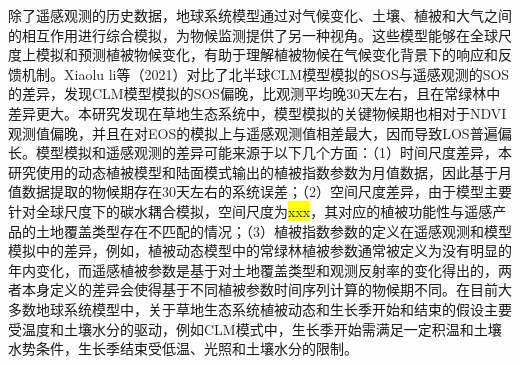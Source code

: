 除了遥感观测的历史数据，地球系统模型通过对气候变化、土壤、植被和大气之间的相互作用进行综合模拟，为物候监测提供了另一种视角。这些模型能够在全球尺度上模拟和预测植被物候变化，有助于理解植被物候在气候变化背景下的响应和反馈机制。Xiaolu li等（2021）对比了北半球CLM模型模拟的SOS与遥感观测的SOS的差异，发现CLM模型模拟的SOS偏晚，比观测平均晚30天左右，且在常绿林中差异更大。本研究发现在草地生态系统中，模型模拟的关键物候期也相对于NDVI观测值偏晚，并且在对EOS的模拟上与遥感观测值相差最大，因而导致LOS普遍偏长。模型模拟和遥感观测的差异可能来源于以下几个方面：（1）时间尺度差异，本研究使用的动态植被模型和陆面模式输出的植被指数参数为月值数据，因此基于月值数据提取的物候期存在30天左右的系统误差；（2）空间尺度差异，由于模型主要针对全球尺度下的碳水耦合模拟，空间尺度为\colorbox{yellow}{xxx}，其对应的植被功能性与遥感产品的土地覆盖类型存在不匹配的情况；（3）植被指数参数的定义在遥感观测和模型模拟中的差异，例如，植被动态模型中的常绿林植被参数通常被定义为没有明显的年内变化，而遥感植被参数是基于对土地覆盖类型和观测反射率的变化得出的，两者本身定义的差异会使得基于不同植被参数时间序列计算的物候期不同。在目前大多数地球系统模型中，关于草地生态系统植被动态和生长季开始和结束的假设主要受温度和土壤水分的驱动，例如CLM模式中，生长季开始需满足一定积温和土壤水势条件，生长季结束受低温、光照和土壤水分的限制。